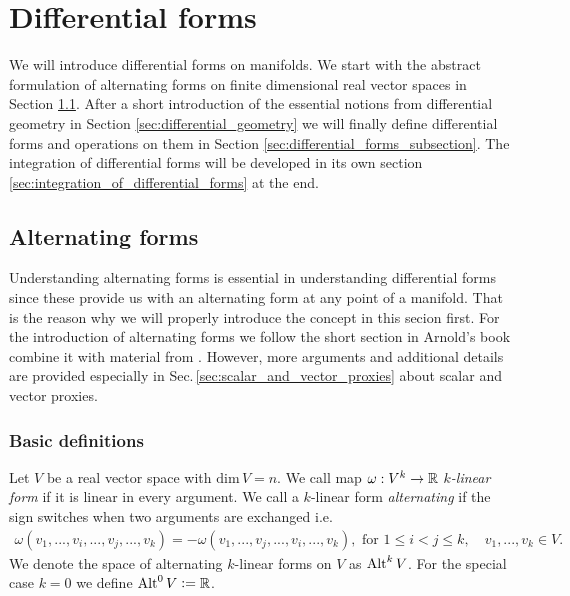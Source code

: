 \documentclass[../master_thesis.tex]{subfiles}
\begin{document}
\section{Differential forms}\label{sec:differential_forms}

We will introduce differential forms on manifolds. We start with the abstract 
formulation of alternating forms on finite dimensional real vector spaces 
in Section \ref{sec:alternating_maps}. After a short introduction of 
the essential notions from differential geometry in Section \ref{sec:differential_geometry}
we will finally define differential forms and operations on them 
in Section \ref{sec:differential_forms_subsection}. The integration 
of differential forms will be developed in its own section \ref{sec:integration_of_differential_forms} 
at the end.

\subsection{Alternating forms} \label{sec:alternating_maps}

Understanding alternating forms is essential in understanding differential forms 
since these provide us with an alternating form at any point of a manifold. 
That is the reason why we will properly introduce the concept in this 
secion first.
For the introduction of alternating forms we follow
the short section in Arnold's book
\cite[Sec. 6.1.]{arnold} combine it 
with material from \cite[Sec.\,V.1]{topology_and_geometry}.
However, more arguments and additional details are provided especially  
in Sec.\,\ref{sec:scalar_and_vector_proxies} about scalar and vector proxies.

\subsubsection{Basic definitions}

\begin{definition}
    Let $V$ be a real vector space with $\text{dim}\,V = n$.
    We call map $\omega: V^k \rightarrow \mathbb{R}$ 
    \textit{$k$-linear form} if it is linear in every argument.
    We call a $k$-linear form 
    \textit{alternating} if the sign switches when two arguments are exchanged 
    i.e.
    \begin{align*}
        \omega(v_1,...,v_i,...,v_j,...,v_k)
        = - \omega(v_1,...,v_j,...,v_i,...,v_k), \text{ for } 1\leq i < j \leq k,
        \quad v_1,...,v_k \in V.
    \end{align*}
    We denote the space of alternating $k$-linear forms on $V$ as ${\text{Alt}^{k}\,V}$.
    For the special case $k=0$ we define ${\text{Alt}^{0}\,V} \vcentcolon= \mathbb{R}$.
\end{definition}
\end{document}
